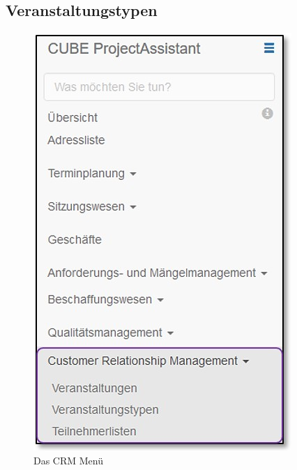 \pagebreak
\subsection{Veranstaltungstypen}

\begin{figure}   %
  \vspace{-35pt}      %
  \begin{center}
    \includegraphics[width=1\linewidth]{../chapters/10_CRM/pictures/10-1-1_Menu_CRM.jpg}
  \end{center}
  \vspace{-20pt}
  \caption{Das CRM Menü}
  \vspace{-10pt}
\end{figure}

